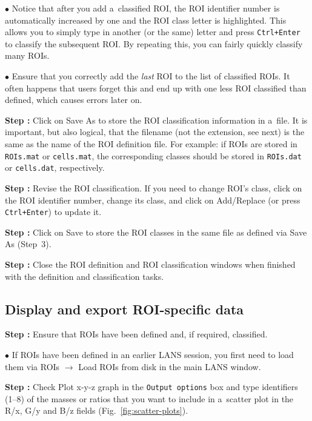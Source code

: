 \documentclass[a4paper, 11pt]{article}
\newcommand{\ttt}[1]{\texttt{#1}}
\newcommand{\lans}[1]{{\color{magenta}#1}}
\newcommand{\lanscb}[1]{{\color{darkgreen}#1}}
\newcommand{\lanstf}[1]{{\color{cyan}#1}}
\newcommand\ra{\rightarrow}
\newcounter{step}
\newcommand\s{\addtocounter{step}{1}\vskip5pt\noindent\textbf{Step \thestep:}{ }}
\newcommand\bul{\vskip5pt\noindent$\bullet${ }}
\begin{document}
\bul Notice that after you add a~classified ROI, the ROI identifier number is automatically increased by one and the ROI class letter is highlighted. This allows you to simply type in another (or the same) letter and press \ttt{Ctrl+Enter} to classify the subsequent ROI. By repeating this, you can fairly quickly classify many ROIs.

\bul Ensure that you correctly add the \emph{last} ROI to the list of classified ROIs. It often happens that users forget this and end up with one less ROI classified than defined, which causes errors later on.

\s Click on \lans{Save As} to store the ROI classification information in a~file. It is important, but also logical, that the filename (not the extension, see next) is the same as the name of the ROI definition file. For example: if ROIs are stored in \ttt{ROIs.mat} or \ttt{cells.mat}, the corresponding classes should be stored in \ttt{ROIs.dat} or \ttt{cells.dat}, respectively.

\s Revise the ROI classification. If you need to change ROI's class, click on the ROI identifier number, change its class, and click on \lans{Add/Replace} (or press \ttt{Ctrl+Enter}) to update it.

\s Click on \lans{Save} to store the ROI classes in the same file as defined via \lans{Save As} (Step~3).

\s Close the ROI definition and ROI classification windows when finished with the definition and classification tasks.


\subsection{Display and export ROI-specific data}
\setcounter{step}{0}

\s Ensure that ROIs have been defined and, if required, classified.

\bul If ROIs have been defined in an earlier LANS session, you first need to load them via \lans{ROIs} $\ra$ \lans{Load ROIs from disk} in the main LANS window.

\s Check \lanscb{Plot x-y-z graph} in the \ttt{Output options} box and type identifiers (1--8) of the masses or ratios that you want to include in a~scatter plot in the \lanstf{R/x}, \lanstf{G/y} and \lanstf{B/z} fields (Fig.~\ref{fig:scatter-plots}).
\end{document}
